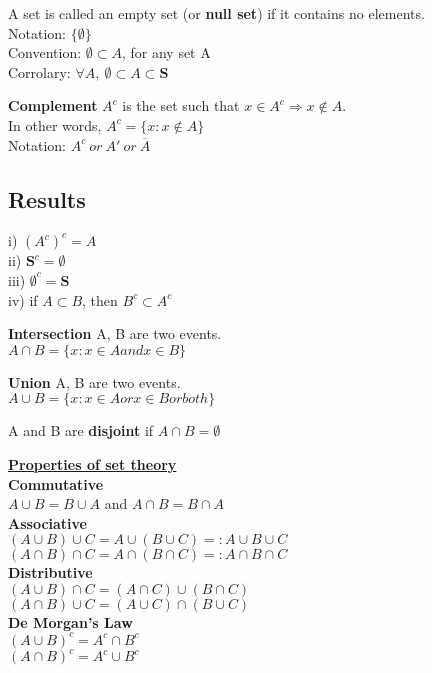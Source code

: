 \documentclass[12pt, oneside, letterpaper]{notes}
\begin{document}
\begin{mydef}
  A set is called an empty set (or \textbf{null set}) if it contains 
  no elements.\\
  \indent Notation: $\{ \emptyset \}$ \\
  \indent Convention: $\emptyset \subset A$, for any set A \\
  \indent Corrolary: $\forall A, \: \emptyset \subset A \subset \textbf{S}$
\end{mydef}

\begin{mydef}
  \textbf{Complement} $A^c$ is the set such that $x \in A^c 
  \Rightarrow x \notin A$.\\
  \indent In other words, $A^c = \{ x : x \notin A \}$ \\
  \indent Notation: $A^c \: or \: A' \: or \: \overline{A}$
\end{mydef}

\subsection*{Results}
i) \indent $(A^c)^c = A$ \\
ii) \indent $\textbf{S}^c = \emptyset $\\
iii) \indent $ \emptyset^c = \textbf{S} $\\
iv) \indent if $A \subset B$, then $B^c \subset A^c$


\begin{mydef}
  \textbf{Intersection} A, B are two events.  \\
  \indent $A \cap B = \{x: x \in A and x \in B\}$
\end{mydef}

\begin{mydef}
  \textbf{Union} A, B are two events. \\
  \indent $A \cup B = \{x: x \in A or x \in B or both\}$
\end{mydef}

\begin{mydef}
  A and B are \textbf{disjoint} if $A \cap B = \emptyset$
\end{mydef}

\noindent \underline{\textbf{Properties of set theory}}  \\
\textbf{Commutative}  \\
\indent $A \cup B = B \cup A$ and $A \cap B = B \cap A$ \\
\textbf{Associative}\\
\indent $(A \cup B) \cup C = A \cup (B \cup C) =: A \cup B \cup C$ \\
\indent $(A \cap B) \cap C = A \cap (B \cap C) =: A \cap B \cap C$ \\
\textbf{Distributive}\\
\indent $(A \cup B) \cap C = (A \cap C) \cup (B \cap C)$ \\
\indent $(A \cap B) \cup C = (A \cup C) \cap (B \cup C)$ \\
\textbf{De Morgan's Law}\\
\indent $(A \cup B)^c = A^c \cap B^c$ \\
\indent $(A \cap B)^c = A^c \cup B^c$ \\
\end{document}
